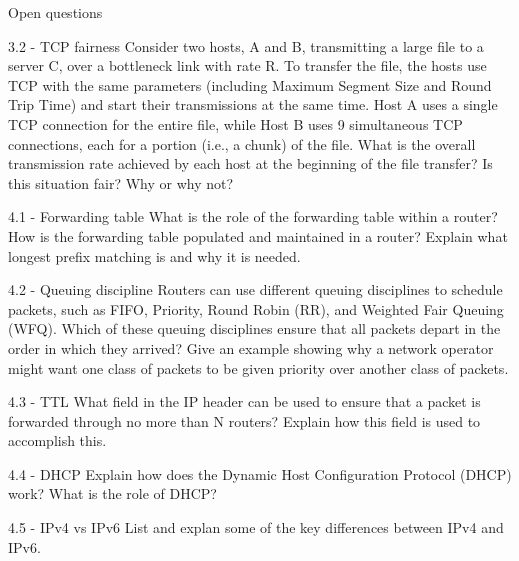 \documentclass[a4paper]{article}
\begin{document}
\begin{quiz}{Open questions}
\begin{essay}[points=1]{3.2 - TCP fairness}
Consider two hosts, A and B, transmitting a large file to a server C, over a bottleneck link with rate R. To transfer the file, the hosts use TCP with the same parameters (including Maximum Segment Size and Round Trip Time) and start their transmissions at the same time. Host A uses a single TCP connection for the entire file, while Host B uses 9 simultaneous TCP connections, each for a portion (i.e., a chunk) of the file. What is the overall transmission rate achieved by each host at the beginning of the file transfer? Is this situation fair? Why or why not?
\end{essay}


\begin{essay}[points=1]{4.1 - Forwarding table}
What is the role of the forwarding table within a router? How is the forwarding table populated and maintained in a router? Explain what longest prefix matching is and why it is needed. 
\end{essay}

\begin{essay}[points=1]{4.2 - Queuing discipline}
Routers can use different queuing disciplines to schedule packets, such as FIFO, Priority, Round Robin (RR), and Weighted Fair Queuing (WFQ). Which of these queuing disciplines ensure that all packets depart in the order in which they arrived? Give an example showing why a network operator might want one class of packets to be given priority over another class of packets.
\end{essay}

\begin{essay}[points=1]{4.3 - TTL}
What field in the IP header can be used to ensure that a packet is forwarded through no more than N routers? Explain how this field is used to accomplish this.
\end{essay}

\begin{essay}[points=1]{4.4 - DHCP}
Explain how does the Dynamic Host Configuration Protocol (DHCP) work? What is the role of DHCP?
\end{essay}

\begin{essay}[points=1]{4.5 - IPv4 vs IPv6}
List and explan some of the key differences between IPv4 and IPv6.
\end{essay}


\end{quiz}
\end{document}
